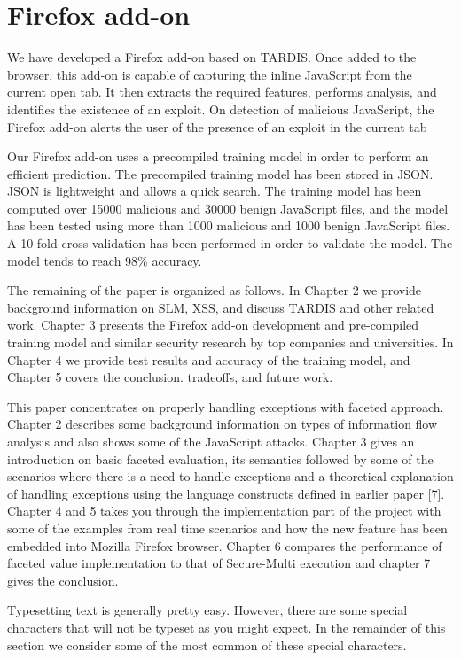 \section{Firefox add-on}

We have developed a Firefox add-on based on TARDIS. Once added to the browser, this add-on is capable of capturing the inline JavaScript from the current open tab. It then extracts the required features, performs analysis, and identifies the existence of an exploit. On detection of malicious JavaScript, the Firefox add-on alerts the user of the presence of an exploit in the current tab 

Our Firefox add-on uses a precompiled training model in order to perform an efficient prediction. The precompiled training model has been stored in JSON. JSON is lightweight and allows a quick search. The training model has been computed over 15000 malicious and 30000 benign JavaScript files, and the model has been tested using more than 1000 malicious and 1000 benign JavaScript files. A 10-fold cross-validation has been performed in order to validate the model. The model tends to reach 98\% accuracy.

The remaining of the paper is organized as follows. In Chapter 2 we provide background information on SLM, XSS, and discuss TARDIS and other related work. Chapter 3 presents the Firefox add-on development and pre-compiled training model and similar security research by top companies and universities. In Chapter 4 we provide test results and accuracy of the training model, and Chapter 5 covers the conclusion. tradeoffs, and future work.

\iffalse
This paper concentrates on properly handling exceptions
with faceted approach. Chapter 2 describes some background information on types of
information flow analysis and also shows some of the JavaScript attacks. Chapter 3
gives an introduction on basic faceted evaluation, its semantics followed by some of the
scenarios where there is a need to handle exceptions and a theoretical explanation
of handling exceptions using the language constructs defined in earlier paper [7].
Chapter 4 and 5 takes you through the implementation part of the project with some
of the examples from real time scenarios and how the new feature has been embedded
into Mozilla Firefox browser. Chapter 6 compares the performance of faceted value
implementation to that of Secure-Multi execution and chapter 7 gives the conclusion.


Typesetting text is generally pretty easy. However, there are some special
characters that will not be typeset as you might expect. In the remainder of this
section we consider some of the most common of these
special characters. 

